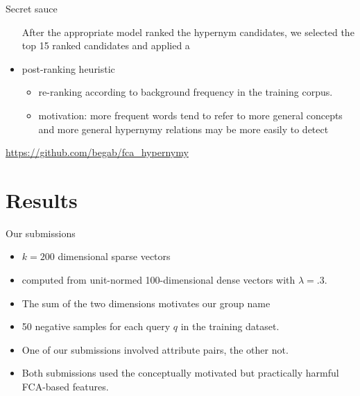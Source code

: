 \documentclass{beamer}
\newlength{\onecolwid}
\begin{document}
\begin{frame}[t]
\begin{columns}[t]
\begin{column}{\onecolwid}
\begin{block}{Secret sauce}
\begin{itemize}

        After the appropriate model ranked the hypernym candidates, we selected
        the top 15 ranked candidates and applied a 
      \item \alert{post-ranking} heuristic 
        \begin{itemize}
          \item re-ranking according to background frequency in the training corpus. 
          \item motivation: more frequent words tend to refer to more general concepts
            and more general hypernymy relations may be more easily to detect
        \end{itemize}
    \end{itemize}
  \end{block}
  \begin{alertblock}{}
    \url{https://github.com/begab/fca_hypernymy}
  \end{alertblock}

  \section{Results} \label{sec:results}

  \begin{block}{Our submissions}
    \begin{itemize} 
      \item $k=200$ dimensional sparse vectors 
      \item computed from unit-normed 100-dimensional dense vectors with
        $\lambda=.3$. 
      \item The sum of the two dimensions motivates our group name
      \item 50 negative samples for each query $q$ in the training dataset. 
      \item One of our submissions involved attribute pairs, the other not. 
      \item Both submissions used the conceptually motivated but practically
        harmful FCA-based features.
    \end{itemize}

    

  \end{block}


\end{column}
\end{columns}
\end{frame}
\end{document}

